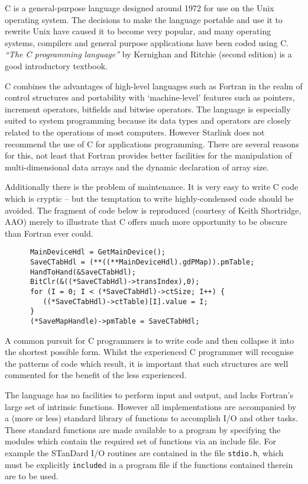 C is  a general-purpose language designed around 1972 for use on the Unix 
operating system.
The decisions to make the language portable and use it to rewrite Unix have
caused it to become very popular, and many operating systems, compilers and 
general purpose applications have been coded using C.
{\sl ``The C programming language''} by Kernighan and Ritchie (second 
edition) is a good introductory textbook.

C combines the advantages of high-level languages such as Fortran in the
realm of control structures and portability with `machine-level' features
such as pointers, increment operators, bitfields and bitwise
operators. The language  is especially suited to system programming because
its data types and operators are closely related to the operations of most
computers. However Starlink does not recommend the use of C for
applications programming. There are several reasons for this, not least
that Fortran provides better facilities for the manipulation of
multi-dimensional data arrays and the dynamic declaration of array size. 

Additionally there is the problem of maintenance.
It is very easy to write  C code which is cryptic -- but the temptation to
write highly-condensed code should be avoided.
The fragment of code below is reproduced (courtesy of Keith Shortridge, AAO) 
merely to illustrate that C offers much more opportunity to be 
obscure than Fortran ever could.
\begin{verbatim}
      MainDeviceHdl = GetMainDevice();
      SaveCTabHdl = (**((**MainDeviceHdl).gdPMap)).pmTable;
      HandToHand(&SaveCTabHdl);
      BitClr(&((*SaveCTabHdl)->transIndex),0);
      for (I = 0; I < (*SaveCTabHdl)->ctSize; I++) {
         ((*SaveCTabHdl)->ctTable)[I].value = I;
      }
      (*SaveMapHandle)->pmTable = SaveCTabHdl;
\end{verbatim}
A common pursuit for C programmers is to write code and then collapse it
into the shortest possible form.
Whilst the experienced C programmer will recognise the patterns of code 
which result,  it is important 
that such structures are well commented for the benefit of the less
experienced.

The language has no facilities to perform input and output, and lacks 
Fortran's large set of intrinsic functions.
However all implementations are accompanied by a (more or less) standard library of functions 
to accomplish I/O and other tasks.
These standard functions are made available to  a program by specifying
the modules  which contain the required set of functions via an include file.
For example the STanDard I/O routines are contained in the file {\tt stdio.h},
which must be explicitly {\tt include}d in a program file if the functions 
contained therein are to be used.





